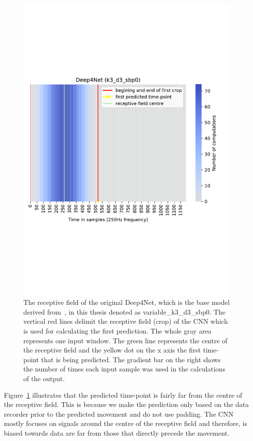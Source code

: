 \begin{figure}[!htbp]
\centering
\includegraphics[width=0.8\linewidth]{img/ch3/deep4net-receptive-field}
\caption[Receptive field]{The receptive field of the original Deep4Net, which is the base model derived from~\cite{Hammer-2021}, in this thesis denoted as {variable}\_k3\_d3\_sbp0.
The vertical red lines delimit the receptive field (crop) of the CNN which is used for calculating the first prediction.
The whole gray area represents one input window.
The green line represents the centre of the receptive field and the yellow dot on the x axis the first time-point that is being predicted.
The gradient bar on the right shows the number of times each input sample was used in the calculations of the output.}
\label{fig:receptive-field}
\end{figure}

Figure~\ref{fig:receptive-field} illustrates that the predicted time-point is fairly far from the centre of the receptive field.
This is because we make the prediction only based on the data recorder prior to the predicted movement and do not use padding.
The CNN mostly focuses on signals around the centre of the receptive field and therefore, is biased towards data are far from those that directly precede the movement.

